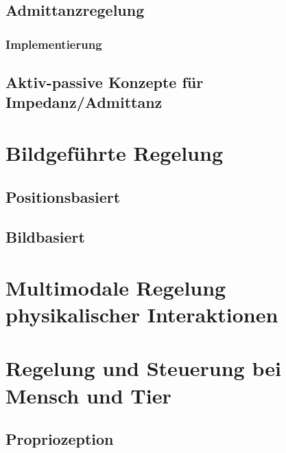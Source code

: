 \documentclass[a4paper, 11pt, accentcolor = tud3b]{tudreport}
\begin{document}
			\subsection{Admittanzregelung} %

				\subsubsection{Implementierung} %

			\subsection{Aktiv-passive Konzepte für Impedanz/Admittanz} %

		\section{Bildgeführte Regelung} %

			\subsection{Positionsbasiert} %

			\subsection{Bildbasiert} %

		\section{Multimodale Regelung physikalischer Interaktionen} %

		\section{Regelung und Steuerung bei Mensch und Tier} %

			\subsection{Propriozeption} %
\end{document}
